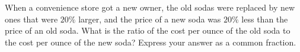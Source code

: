 When a convenience store got a new owner, the old sodas were replaced by new ones that were $20\%$ larger, and the price of a new soda was $20\%$ less than the price of an old soda. What is the ratio of the cost per ounce of the old soda to the cost per ounce of the new soda? Express your answer as a common fraction.
